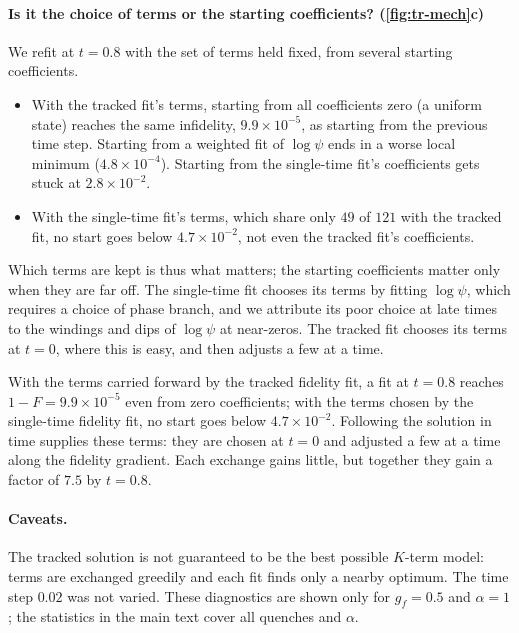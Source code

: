 \documentclass[11pt,a4paper]{article}
\newcommand{\tracked}{\textcolor{ctracked}{tracked fidelity fit}}
\newcommand{\fidfit}{\textcolor{cfid}{single-time fidelity fit}}
\begin{document}
\paragraph{Is it the choice of terms or the starting coefficients? (\cref{fig:tr-mech}c)} We refit at $t=0.8$ with the set of terms held fixed, from several starting coefficients.
\begin{itemize}
  \item With the tracked fit's terms, starting from all coefficients zero (a uniform state) reaches the same infidelity, $9.9\times10^{-5}$, as starting from the previous time step. Starting from a weighted fit of $\log\psi$ ends in a worse local minimum ($4.8\times10^{-4}$). Starting from the single-time fit's coefficients gets stuck at $2.8\times10^{-2}$.
  \item With the single-time fit's terms, which share only $49$ of $121$ with the tracked fit, no start goes below $4.7\times10^{-2}$, not even the tracked fit's coefficients.
\end{itemize}
Which terms are kept is thus what matters; the starting coefficients matter only when they are far off. The single-time fit chooses its terms by fitting $\log\psi$, which requires a choice of phase branch, and we attribute its poor choice at late times to the windings and dips of $\log\psi$ at near-zeros. The tracked fit chooses its terms at $t=0$, where this is easy, and then adjusts a few at a time.

\begin{finding}
With the terms carried forward by the \tracked{}, a fit at $t=0.8$ reaches $1-F=9.9\times10^{-5}$ even from zero coefficients; with the terms chosen by the \fidfit{}, no start goes below $4.7\times10^{-2}$. Following the solution in time supplies these terms: they are chosen at $t=0$ and adjusted a few at a time along the fidelity gradient. Each exchange gains little, but together they gain a factor of $7.5$ by $t=0.8$.
\end{finding}

\paragraph{Caveats.} The tracked solution is not guaranteed to be the best possible $K$-term model: terms are exchanged greedily and each fit finds only a nearby optimum. The time step $0.02$ was not varied. These diagnostics are shown only for $g_f=0.5$ and $\alpha=1$; the statistics in the main text cover all quenches and $\alpha$.
\end{document}
